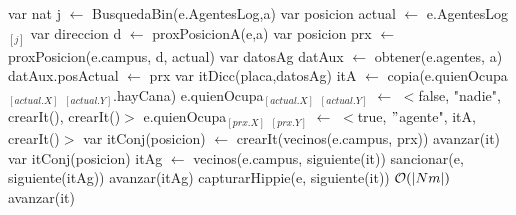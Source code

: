 \begin{algorithm}[H]
\begin{algorithmic}[1]
 
    \State var nat j $\gets$ BusquedaBin(e.AgentesLog,a) 
    \State var posicion actual $\gets$ e.AgentesLog$_{[j]}$ 
    \State var direccion d $\gets$ proxPosicionA(e,a) 
    \State var posicion prx $\gets$ proxPosicion(e.campus, d, actual) 
    \State var datosAg datAux $\gets$ obtener(e.agentes, a) 
    \State datAux.posActual $\gets$ prx 
    \State var itDicc(placa,datosAg) itA $\gets$ copia(e.quienOcupa$_{[actual.X]}$ $_{[actual.Y]}$.hayCana) 
    \State e.quienOcupa$_{[actual.X]}$ $_{[actual.Y]}$ $\gets$ $<$false, "nadie", crearIt(), crearIt()$>$ 
    \State e.quienOcupa$_{[prx.X]}$ $_{[prx.Y]}$ $\gets$ $<$true, $"$agente", itA, crearIt()$>$ 
    \State var itConj(posicion) $\gets$ crearIt(vecinos(e.campus, prx)) 
     
    		\State avanzar(it)	
    	\Else
    		 
    			\State var itConj(posicion) itAg $\gets$ vecinos(e.campus, siguiente(it)) 
    			  
    				  
    					\State sancionar(e, siguiente(itAg))  
    				\EndIf
	    			\State avanzar(itAg)	
    			\EndWhile
    		\Else
    			  
    				\State capturarHippie(e, siguiente(it))  \Comment $\mathcal{O}(\vert Nm \vert)$
    			\EndIf
    		\EndIf
    	\EndIf	
    	\State avanzar(it)	
    \EndWhile
\EndFunction
\end{algorithmic}
\end{algorithm}


